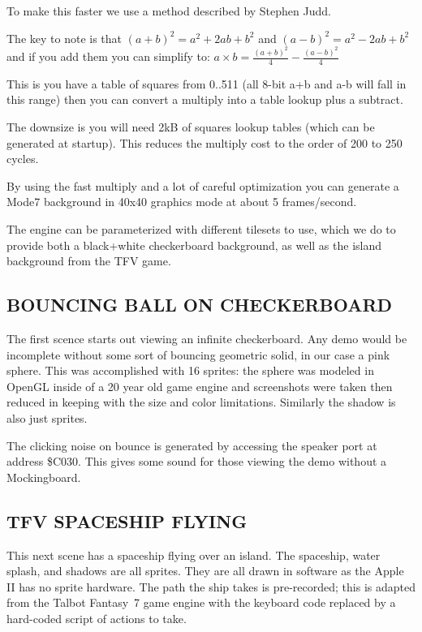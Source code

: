 \documentclass[twocolumn]{article}
\begin{document}
  To make this faster we use a method described by Stephen Judd.

  The key to note is that $(a+b)^{2} = a^{2}+2ab+b^{2}$ 
	and $(a-b)^{2}=a^{2}-2ab+b^{2}$
  and if you add them you can simplify to:
	$a\times b =\frac{(a+b)^{2}}{4} - \frac{(a-b)^2}{4}$

  This is you have a table of squares from 0..511 (all 8-bit a+b and a-b
  will fall in this range) then you can convert a multiply into a table
  lookup plus a subtract.

  The downsize is you will need 2kB of squares lookup tables (which can
  be generated at startup).  This reduces the multiply cost to the order
  of 200 to 250 cycles.

  By using the fast multiply and a lot of careful optimization you can
  generate a Mode7 background in 40x40 graphics mode at about 5 frames/second.

  The engine can be parameterized with different tilesets to use, which we
  do to provide both a black+white checkerboard background, as well as the
  island background from the TFV game.

\subsection{BOUNCING BALL ON CHECKERBOARD}

The first scence starts out viewing an infinite checkerboard.
Any demo would be incomplete without some sort of bouncing geometric solid,
in our case a pink sphere.
This was accomplished with 16 sprites:
the sphere was modeled in OpenGL inside of a 20 year old game engine
and screenshots were taken then reduced in keeping with the size and
color limitations.
Similarly the shadow is also just sprites.

The clicking noise on bounce is generated by accessing the speaker port
at address \$C030.
This gives some sound for those viewing the demo without a Mockingboard.

\subsection{TFV SPACESHIP FLYING}


This next scene has a spaceship flying over an island.
The spaceship, water splash, and shadows are all sprites.
They are all drawn in software as the Apple II has no sprite hardware.
The path the ship takes is pre-recorded; this is adapted from the
Talbot Fantasy~7 game engine with the keyboard code replaced by a hard-coded
script of actions to take.
\end{document}
